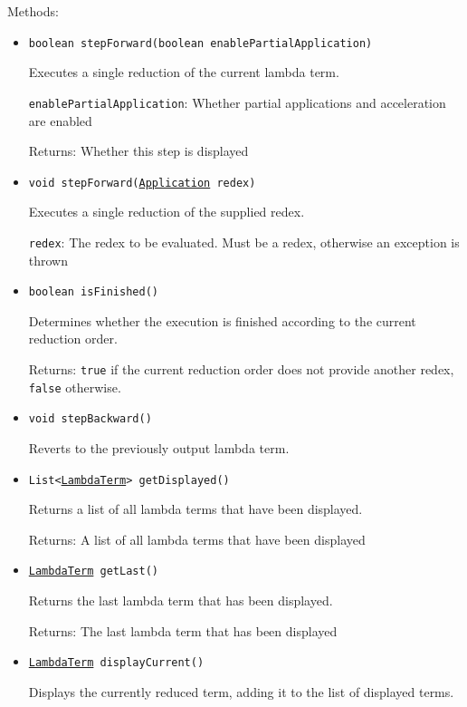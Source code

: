 Methods:
\begin{itemize}
\item \texttt{boolean stepForward(boolean enablePartialApplication)}

Executes a single reduction of the current lambda term.

\texttt{enablePartialApplication}: Whether partial applications
 and acceleration are enabled

Returns: Whether this step is displayed

\item \texttt{void stepForward(\hyperref[type:edu.kit.wavelength.client.model.term.Application]{Application} redex)}

Executes a single reduction of the supplied redex.

\texttt{redex}: The redex to be evaluated. Must be a redex, otherwise an
 exception is thrown

\item \texttt{boolean isFinished()}

Determines whether the execution is finished according to the current reduction order.

Returns: \texttt{true} if the current reduction order does not provide another redex,
 \texttt{false} otherwise.

\item \texttt{void stepBackward()}

Reverts to the previously output lambda term.

\item \texttt{List<\hyperref[type:edu.kit.wavelength.client.model.term.LambdaTerm]{LambdaTerm}> getDisplayed()}

Returns a list of all lambda terms that have been displayed.

Returns: A list of all lambda terms that have been displayed

\item \texttt{\hyperref[type:edu.kit.wavelength.client.model.term.LambdaTerm]{LambdaTerm} getLast()}

Returns the last lambda term that has been displayed.

Returns: The last lambda term that has been displayed

\item \texttt{\hyperref[type:edu.kit.wavelength.client.model.term.LambdaTerm]{LambdaTerm} displayCurrent()}

Displays the currently reduced term, adding it to the list of displayed terms.


\end{itemize}
